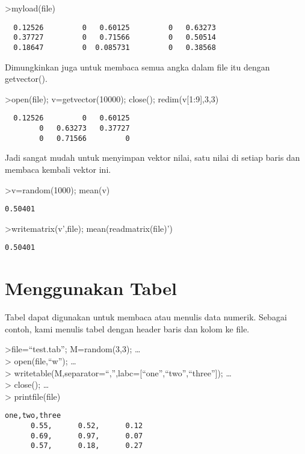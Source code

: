 \documentclass[
]{book}
\begin{document}
\textgreater myload(file)

\begin{verbatim}
  0.12526         0   0.60125         0   0.63273 
  0.37727         0   0.71566         0   0.50514 
  0.18647         0  0.085731         0   0.38568 
\end{verbatim}

Dimungkinkan juga untuk membaca semua angka dalam file itu dengan getvector().

\textgreater open(file); v=getvector(10000); close(); redim(v{[}1:9{]},3,3)

\begin{verbatim}
  0.12526         0   0.60125 
        0   0.63273   0.37727 
        0   0.71566         0 
\end{verbatim}

Jadi sangat mudah untuk menyimpan vektor nilai, satu nilai di setiap baris dan membaca kembali vektor ini.

\textgreater v=random(1000); mean(v)

\begin{verbatim}
0.50401
\end{verbatim}

\textgreater writematrix(v',file); mean(readmatrix(file)')

\begin{verbatim}
0.50401
\end{verbatim}

\chapter{Menggunakan Tabel}\label{menggunakan-tabel}

Tabel dapat digunakan untuk membaca atau menulis data numerik. Sebagai contoh, kami menulis tabel dengan header baris dan kolom ke file.

\textgreater file=``test.tab''; M=random(3,3); \ldots{}\\
\textgreater{} open(file,``w''); \ldots{}\\
\textgreater{} writetable(M,separator=``,'',labc={[}``one'',``two'',``three''{]}); \ldots{}\\
\textgreater{} close(); \ldots{}\\
\textgreater{} printfile(file)

\begin{verbatim}
one,two,three
      0.55,      0.52,      0.12
      0.69,      0.97,      0.07
      0.57,      0.18,      0.27
\end{verbatim}
\end{document}

